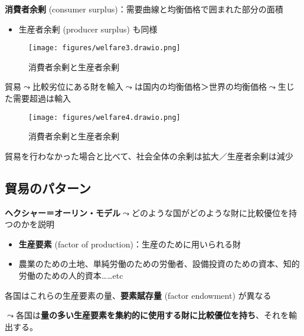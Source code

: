 \documentclass[
  xelatex,
  ja=standard]{bxjsarticle}
\providecommand{\tightlist}{%
  \setlength{\itemsep}{0pt}\setlength{\parskip}{0pt}}\usepackage{longtable,booktabs,array}
\begin{document}
\textbf{消費者余剰} (consumer
surplus)：需要曲線と均衡価格で囲まれた部分の面積

\begin{itemize}
\tightlist
\item
  生産者余剰 (producer surplus) も同様
\end{itemize}

\begin{figure}[htpb]

{\centering \texttt{[image: figures/welfare3.drawio.png]}

}

\caption{消費者余剰と生産者余剰}

\end{figure}

貿易\(\leadsto\)比較劣位にある財を輸入\(\leadsto\)は国内の均衡価格＞世界の均衡価格\(\leadsto\)生じた需要超過は輸入

\begin{figure}[htpb]

{\centering \texttt{[image: figures/welfare4.drawio.png]}

}

\caption{消費者余剰と生産者余剰}

\end{figure}

貿易を行わなかった場合と比べて、社会全体の余剰は拡大／生産者余剰は減少

\hypertarget{ux8cbfux6613ux306eux30d1ux30bfux30fcux30f3}{%
\subsection{貿易のパターン}\label{ux8cbfux6613ux306eux30d1ux30bfux30fcux30f3}}

\textbf{ヘクシャー＝オーリン・モデル}\(\leadsto\)どのような国がどのような財に比較優位を持つのかを説明

\begin{itemize}
\tightlist
\item
  \textbf{生産要素} (factor of production)：生産のために用いられる財
\item
  農業のための土地、単純労働のための労働者、設備投資のための資本、知的労働のための人的資本\ldots\ldots etc
\end{itemize}

各国はこれらの生産要素の量、\textbf{要素賦存量} (factor endowment)
が異なる

\(\leadsto\)各国は\textbf{量の多い生産要素を集約的に使用する財に比較優位を持ち}、それを輸出する。
\end{document}
